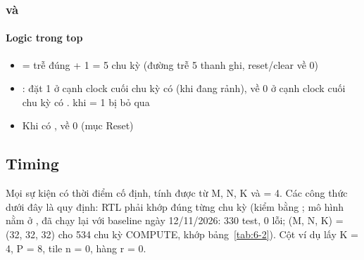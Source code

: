 \documentclass[10pt,a4paper]{article}
\begin{document}
\subsubsection{\texorpdfstring{}{o\_busy} và \texorpdfstring{}{o\_pe\_done}}\label{sec:5.6}

\paragraph{Logic trong top}\label{par:5-10}
\begin{itemize}
\item {} =  trễ đúng  + 1 = 5 chu kỳ (đường trễ 5 thanh ghi, reset/clear về 0)
\item {}: đặt 1 ở cạnh clock cuối chu kỳ có  (khi đang rảnh), về 0 ở cạnh clock cuối chu kỳ có .  khi  = 1 bị bỏ qua
\item Khi có ,  về 0 (mục Reset)
\end{itemize}

\subsection{Timing}\label{sec:6}

Mọi sự kiện có thời điểm cố định, tính được từ M, N, K và  = 4. Các công thức dưới đây là quy định: RTL phải khớp đúng từng chu kỳ (kiểm bằng ; mô hình nằm ở , đã chạy lại với baseline ngày 12/11/2026: 330 test, 0 lỗi; (M, N, K) = (32, 32, 32) cho 534 chu kỳ COMPUTE, khớp bảng~\ref{tab:6-2}). Cột ví dụ lấy K = 4, P = 8, tile n = 0, hàng r = 0.
\end{document}
